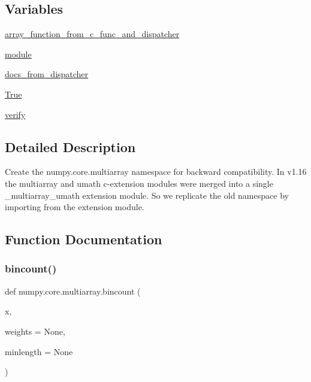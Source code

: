 \subsection*{Variables}
\begin{DoxyCompactItemize}
\item 
\hyperlink{namespacenumpy_1_1core_1_1multiarray_a8f0985446cd1812ab7345b24aaf37a2b}{array\+\_\+function\+\_\+from\+\_\+c\+\_\+func\+\_\+and\+\_\+dispatcher}
\item 
\hyperlink{namespacenumpy_1_1core_1_1multiarray_af1f3d50b172c38e9f497fe910adec472}{module}
\item 
\hyperlink{namespacenumpy_1_1core_1_1multiarray_a9a63e9dd9dc6e5a022d91d6a665ea2b6}{docs\+\_\+from\+\_\+dispatcher}
\item 
\hyperlink{namespacenumpy_1_1core_1_1multiarray_ab11017239b12f3e4190bdc2bd61651de}{True}
\item 
\hyperlink{namespacenumpy_1_1core_1_1multiarray_acbfbfcc8b75c384506a4673a5f64a185}{verify}
\end{DoxyCompactItemize}


\subsection{Detailed Description}
\begin{DoxyVerb}Create the numpy.core.multiarray namespace for backward compatibility. In v1.16
the multiarray and umath c-extension modules were merged into a single
_multiarray_umath extension module. So we replicate the old namespace
by importing from the extension module.\end{DoxyVerb}
 

\subsection{Function Documentation}
\mbox{\label{namespacenumpy_1_1core_1_1multiarray_ac4f1337a7091b3c476fa64b4471825cd}} 
\subsubsection{\texorpdfstring{bincount()}{bincount()}}
{\footnotesize\ttfamily def numpy.\+core.\+multiarray.\+bincount (\begin{DoxyParamCaption}\item[{}]{x,  }\item[{}]{weights = {\ttfamily None},  }\item[{}]{minlength = {\ttfamily None} }\end{DoxyParamCaption})}

